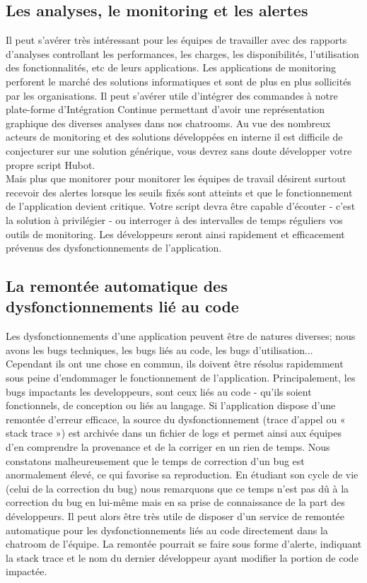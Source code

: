       \subsection{Les analyses, le monitoring et les alertes}
      Il peut s'avérer très intéressant pour les équipes de travailler avec des rapports d'analyses controllant les performances, les charges, les disponibilités, l'utilisation des fonctionnalités, etc de leurs applications. Les applications de monitoring perforent le marché des solutions informatiques et sont de plus en plus sollicités par les organisations. Il peut s'avérer utile d'intégrer des commandes à notre plate-forme d'Intégration Continue permettant d'avoir une représentation graphique des diverses analyses dans nos chatrooms. Au vue des nombreux acteurs de monitoring et des solutions développées en interne il est difficile de conjecturer sur une solution générique, vous devrez sans doute développer votre propre script Hubot.\\

      Mais plus que monitorer pour monitorer les équipes de travail désirent surtout recevoir des alertes lorsque les seuils fixés sont atteints et que le fonctionnement de l'application devient critique. Votre script devra être capable d'écouter - c'est la solution à privilégier - ou interroger à des intervalles de temps réguliers vos outils de monitoring. Les développeurs seront ainsi rapidement et efficacement prévenus des dysfonctionnements de l'application.

      \subsection{La remontée automatique des dysfonctionnements lié au code}
      Les dysfonctionnements d'une application peuvent être de natures diverses; nous avons les bugs techniques, les bugs liés au code, les bugs d'utilisation... Cependant ils ont une chose en commun, ils doivent être résolus rapidemment sous peine d'endommager le fonctionnement de l'application. Principalement, les bugs impactants les developpeurs, sont ceux liés au code - qu'ils soient fonctionnels, de conception ou liés au langage. Si l'application dispose d'une remontée d'erreur efficace, la source du dysfonctionnement (trace d'appel ou « stack trace ») est archivée dans un fichier de logs et permet ainsi aux équipes d'en comprendre la provenance et de la corriger en un rien de temps. Nous constatons malheureusement que le temps de correction d'un bug est anormalement élevé, ce qui favorise sa reproduction. En étudiant son cycle de vie (celui de la correction du bug) nous remarquons que ce temps n'est pas dû à la correction du bug en lui-même mais en sa prise de connaissance de la part des développeurs. Il peut alors être très utile de disposer d'un service de remontée automatique pour les dysfonctionnements liés au code directement dans la chatroom de l'équipe. La remontée pourrait se faire sous forme d'alerte, indiquant la stack trace et le nom du dernier développeur ayant modifier la portion de code impactée.\\


